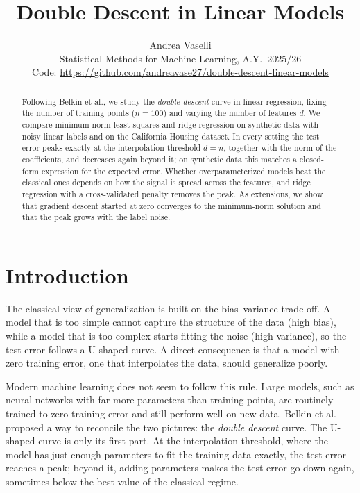 \documentclass[11pt,a4paper]{article}
\title{Double Descent in Linear Models}
\author{Andrea Vaselli\\[2pt]
        \small Statistical Methods for Machine Learning, A.Y.\ 2025/26\\
        \small Code: \url{https://github.com/andreavase27/double-descent-linear-models}}
\date{}
\begin{document}
\maketitle

\begin{abstract}
Following Belkin et al., we study the \emph{double descent} curve in
linear regression, fixing the number of training points ($n = 100$) and
varying the number of features $d$. We compare minimum-norm least squares
and ridge regression on synthetic data with noisy linear labels and on the
California Housing dataset. In every setting the test error peaks exactly
at the interpolation threshold $d = n$, together with the norm of the
coefficients, and decreases again beyond it; on synthetic data this
matches a closed-form expression for the expected error. Whether overparameterized
models beat the classical ones depends on how the signal is spread across
the features, and ridge regression with a cross-validated penalty removes
the peak. As extensions, we show that gradient descent started at zero
converges to the minimum-norm solution and that the peak grows with the
label noise.
\end{abstract}

\section{Introduction}

The classical view of generalization is built on the bias--variance
trade-off. A model that is too simple cannot capture the structure of the
data (high bias), while a model that is too complex starts fitting the noise
(high variance), so the test error follows a U-shaped curve. A direct
consequence is that a model with zero
training error, one that interpolates the data, should generalize poorly.

Modern machine learning does not seem to follow this rule. Large models,
such as neural networks with far more parameters than training points, are
routinely trained to zero training error and still perform well on new
data. Belkin et al.~\cite{belkin2019reconciling} proposed a way to reconcile
the two pictures: the \emph{double descent} curve. The U-shaped curve is
only its first part. At the interpolation threshold, where the model has
just enough parameters to fit the training data exactly, the test error
reaches a peak; beyond it, adding parameters makes the test error go down
again, sometimes below the best value of the classical regime.
\end{document}
